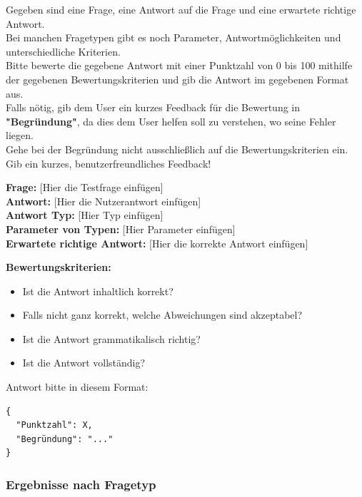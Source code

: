 \documentclass[a4paper,12pt]{article}
\begin{document}
\begin{mdframed}[linewidth=1pt, backgroundcolor=gray!10, roundcorner=5pt]
\label{fig:Allgemeiner Prompt}

Gegeben sind eine Frage, eine Antwort auf die Frage und eine erwartete richtige Antwort.\\
Bei manchen Fragetypen gibt es noch Parameter, Antwortmöglichkeiten und unterschiedliche Kriterien.\\
Bitte bewerte die gegebene Antwort mit einer Punktzahl von 0 bis 100 mithilfe der gegebenen Bewertungskriterien und gib die Antwort im gegebenen Format aus.\\
Falls nötig, gib dem User ein kurzes Feedback für die Bewertung in \textbf{"Begründung"}, da dies dem User helfen soll zu verstehen, wo seine Fehler liegen.\\
Gehe bei der Begründung nicht ausschließlich auf die Bewertungskriterien ein. Gib ein kurzes, benutzerfreundliches Feedback!

\vspace{0.5em}
\textbf{Frage:} [Hier die Testfrage einfügen]\\
\textbf{Antwort:} [Hier die Nutzerantwort einfügen]\\
\textbf{Antwort Typ:} [Hier Typ einfügen]\\
\textbf{Parameter von Typen:} [Hier Parameter einfügen]\\
\textbf{Erwartete richtige Antwort:} [Hier die korrekte Antwort einfügen]

\textbf{Bewertungskriterien:}
\begin{itemize}
  \item Ist die Antwort inhaltlich korrekt?
  \item Falls nicht ganz korrekt, welche Abweichungen sind akzeptabel?
  \item Ist die Antwort grammatikalisch richtig?
  \item Ist die Antwort vollständig?
\end{itemize}

Antwort bitte in diesem Format:
\begin{verbatim}
{
  "Punktzahl": X,
  "Begründung": "..."
}
\end{verbatim}
\end{mdframed}



\subsubsection{Ergebnisse nach Fragetyp}
\end{document}
